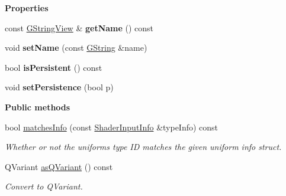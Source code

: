 \begin{Indent}\textbf{ Properties}\par
\begin{DoxyCompactItemize}
\item 
\mbox{\label{structrev_1_1_uniform_a13b20a0d409ec0f0722c918894c87831}} 
const \mbox{\hyperlink{classrev_1_1_g_string_view}{G\+String\+View}} \& {\bfseries get\+Name} () const
\item 
\mbox{\label{structrev_1_1_uniform_a02dd8f7f816d24424dd42416cc138863}} 
void {\bfseries set\+Name} (const \mbox{\hyperlink{classrev_1_1_g_string}{G\+String}} \&name)
\item 
\mbox{\label{structrev_1_1_uniform_a2dcda323a79bf797e8c9b1030a587b4d}} 
bool {\bfseries is\+Persistent} () const
\item 
\mbox{\label{structrev_1_1_uniform_a3f007b9e9666f1b0576d4d909c9a0448}} 
void {\bfseries set\+Persistence} (bool p)
\end{DoxyCompactItemize}
\end{Indent}
\begin{Indent}\textbf{ Public methods}\par
\begin{DoxyCompactItemize}
\item 
\mbox{\label{structrev_1_1_uniform_aa8afa2da0c03756578eaa9998df9bd9b}} 
bool \mbox{\hyperlink{structrev_1_1_uniform_aa8afa2da0c03756578eaa9998df9bd9b}{matches\+Info}} (const \mbox{\hyperlink{structrev_1_1_shader_input_info}{Shader\+Input\+Info}} \&type\+Info) const
\begin{DoxyCompactList}\small\item\em Whether or not the uniform\textquotesingle{}s type ID matches the given uniform info struct. \end{DoxyCompactList}\item 
\mbox{\label{structrev_1_1_uniform_a7b18830f4fe6d96db5cd920bcba073fb}} 
Q\+Variant \mbox{\hyperlink{structrev_1_1_uniform_a7b18830f4fe6d96db5cd920bcba073fb}{as\+Q\+Variant}} () const
\begin{DoxyCompactList}\small\item\em Convert to Q\+Variant. \end{DoxyCompactList}\end{DoxyCompactItemize}
\end{Indent}
